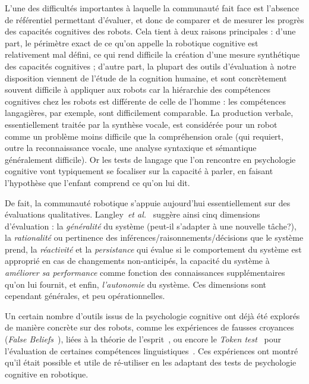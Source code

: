 \documentclass[a4paper]{article}
\newcommand{\etal}{{\textit{et al.~}}}
\begin{document}
L'une des difficultés importantes à laquelle la communauté fait face est
l'absence de référentiel permettant d'évaluer, et donc de comparer et de mesurer
les progrès des capacités cognitives des robots.  Cela tient à deux raisons
principales : d'une part, le périmètre exact de ce qu'on appelle la robotique
cognitive est relativement mal défini, ce qui rend difficile la création d'une
mesure synthétique des capacités cognitives ; d'autre part, la plupart des
outils d'évaluation à notre disposition viennent de l'étude de la cognition
humaine, et sont concrètement souvent difficile à appliquer aux robots car la
hiérarchie des compétences cognitives chez les robots est différente de celle de
l'homme : les compétences langagières, par exemple, sont difficilement
comparable. La production verbale, essentiellement traitée par la synthèse
vocale, est considérée pour un robot comme un problème moins difficile que la
compréhension orale (qui requiert, outre la reconnaissance vocale, une analyse
syntaxique et sémantique généralement difficile). Or les tests de langage que
l'on rencontre en psychologie cognitive vont typiquement se focaliser sur la
capacité à parler, en faisant l'hypothèse que l'enfant comprend ce qu'on lui dit.

De fait, la communauté robotique s'appuie aujourd'hui essentiellement sur des
évaluations qualitatives. Langley~\etal\cite{Langley2006} suggère ainsi cinq
dimensions d'évaluation : la \emph{généralité} du système (peut-il s'adapter à
une nouvelle tâche?), la \emph{rationalité} ou pertinence des
inférences/raisonnements/décisions que le système prend, la \emph{réactivité} et
la \emph{persistance} qui évalue si le comportement du système est approprié en
cas de changements non-anticipés, la capacité du système à \emph{améliorer sa
performance} comme fonction des connaissances supplémentaires qu'on lui fournit,
et enfin, \emph{l'autonomie} du système. Ces dimensions sont cependant
générales, et peu opérationnelles.

Un certain nombre d'outils issus de la psychologie cognitive ont déjà été
explorés de manière concrète sur des robots, comme les expériences de fausses
croyances (\emph{False Beliefs}~\cite{Leslie2000}), liées à la théorie de
l'esprit~\cite{Breazeal2006, warnier2012when, trafton2013act}, ou encore le
\emph{Token test}~\cite{DiSimoni1978} pour l'évaluation de certaines compétences
linguistiques~\cite{Mavridis2006}. Ces expériences ont montré qu'il était
possible et utile de ré-utiliser en les adaptant des tests de psychologie
cognitive en robotique.
\end{document}
